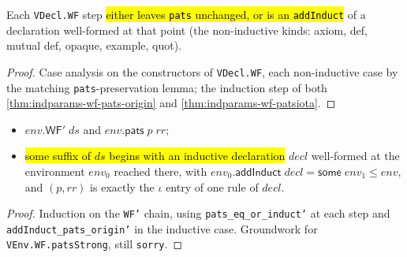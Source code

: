 \begin{lemma}
\label{family:indparams-pats-eq-or-induct}
\leanok
{} 

 Each \texttt{VDecl.WF} step \hl{either leaves \texttt{pats} unchanged, or is
an \texttt{addInduct}} of a declaration well-formed at that point (the non-inductive kinds:
axiom, def, mutual def, opaque, example, quot).
\end{lemma}
\begin{proof}
\leanok
{} Case analysis on the constructors of \texttt{VDecl.WF}, each non-inductive case
by the matching \texttt{pats}-preservation lemma; the induction step of both
\ref{thm:indparams-wf-pats-origin} and \ref{thm:indparams-wf-patsiota}.
\end{proof}

\begin{theorem}
\label{thm:indparams-wf-pats-origin}
\leanok
{} 
\begin{itemize}
\item {} $env.\mathsf{WF'}\;ds$ and $env.\mathsf{pats}\;p\;rr$;
\item {} \hl{some suffix of $ds$ begins with an inductive declaration} $decl$
well-formed at the environment $env_0$ reached there, with $env_0.\mathsf{addInduct}\;decl =
\mathsf{some}\;env_1 \le env$, and $(p,rr)$ is exactly the $\iota$ entry of one rule of
$decl$.
\end{itemize}
\end{theorem}
\begin{proof}
\leanok
{} Induction on the \texttt{WF'} chain, using \texttt{pats\_eq\_or\_induct'} at
each step and \texttt{addInduct\_pats\_origin'} in the inductive case.
 Groundwork for \texttt{VEnv.WF.patsStrong}, still \texttt{sorry}.
\end{proof}


